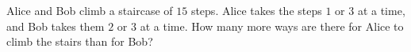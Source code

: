 Alice and Bob climb a staircase of $15$ steps. Alice takes the steps $1$ or $3$ at a time, and Bob takes them $2$ or $3$ at a time. How many more ways are there for Alice to climb the stairs than for Bob?
